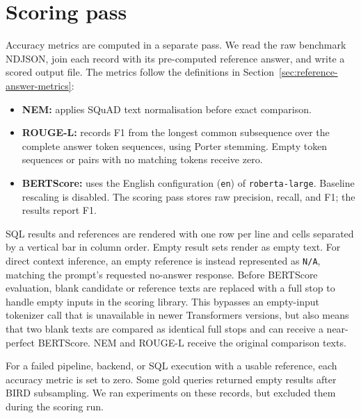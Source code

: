 \section{Scoring pass} \label{sec:scoring-pass}

Accuracy metrics are computed in a separate pass. We read the raw benchmark NDJSON, join each record with its
pre-computed reference answer, and write a scored output file. The metrics follow the definitions in
Section~\ref{sec:reference-answer-metrics}:

\begin{itemize}
  \item \textbf{NEM:} applies SQuAD text normalisation before exact comparison.
  \item \textbf{ROUGE-L:} records F1 from the longest common subsequence over the complete answer token
    sequences, using Porter stemming. Empty token sequences or pairs with no matching tokens receive zero.
  \item \textbf{BERTScore:} uses the English configuration (\texttt{en}) of \texttt{roberta-large}. Baseline
    rescaling is disabled. The scoring pass stores raw precision, recall, and F1; the results report F1.
\end{itemize}

SQL results and references are rendered with one row per line and cells separated by a vertical bar in column
order. Empty result sets render as empty text. For direct context inference, an empty reference is instead
represented as \texttt{N/A}, matching the prompt's requested no-answer response. Before BERTScore evaluation,
blank candidate or reference texts are replaced with a full stop to handle empty inputs in the scoring
library. This bypasses an empty-input tokenizer call that is unavailable in newer Transformers versions, but
also means that two blank texts are compared as identical full stops and can receive a near-perfect
BERTScore. NEM and ROUGE-L receive the original comparison texts.

For a failed pipeline, backend, or SQL execution with a usable reference, each accuracy metric is set to
zero. Some gold queries returned empty results after BIRD subsampling. We ran experiments on these records,
but excluded them during the scoring run.
